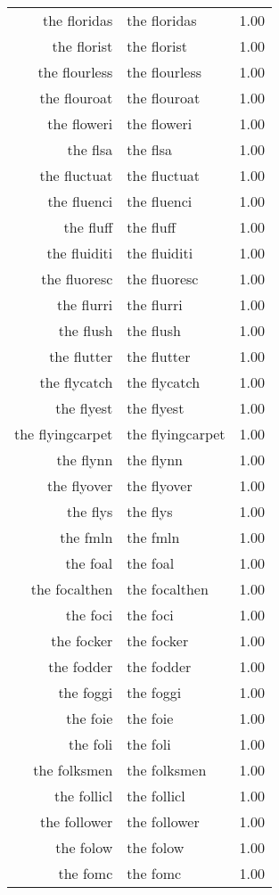 \begin{table}[ht]
\begin{tabular}{rlr}
  the floridas & the floridas & 1.00 \\ 
  the florist & the florist & 1.00 \\ 
  the flourless & the flourless & 1.00 \\ 
  the flouroat & the flouroat & 1.00 \\ 
  the floweri & the floweri & 1.00 \\ 
  the flsa & the flsa & 1.00 \\ 
  the fluctuat & the fluctuat & 1.00 \\ 
  the fluenci & the fluenci & 1.00 \\ 
  the fluff & the fluff & 1.00 \\ 
  the fluiditi & the fluiditi & 1.00 \\ 
  the fluoresc & the fluoresc & 1.00 \\ 
  the flurri & the flurri & 1.00 \\ 
  the flush & the flush & 1.00 \\ 
  the flutter & the flutter & 1.00 \\ 
  the flycatch & the flycatch & 1.00 \\ 
  the flyest & the flyest & 1.00 \\ 
  the flyingcarpet & the flyingcarpet & 1.00 \\ 
  the flynn & the flynn & 1.00 \\ 
  the flyover & the flyover & 1.00 \\ 
  the flys & the flys & 1.00 \\ 
  the fmln & the fmln & 1.00 \\ 
  the foal & the foal & 1.00 \\ 
  the focalthen & the focalthen & 1.00 \\ 
  the foci & the foci & 1.00 \\ 
  the focker & the focker & 1.00 \\ 
  the fodder & the fodder & 1.00 \\ 
  the foggi & the foggi & 1.00 \\ 
  the foie & the foie & 1.00 \\ 
  the foli & the foli & 1.00 \\ 
  the folksmen & the folksmen & 1.00 \\ 
  the follicl & the follicl & 1.00 \\ 
  the follower & the follower & 1.00 \\ 
  the folow & the folow & 1.00 \\ 
  the fomc & the fomc & 1.00 \\ 

\end{tabular}
\end{table}
